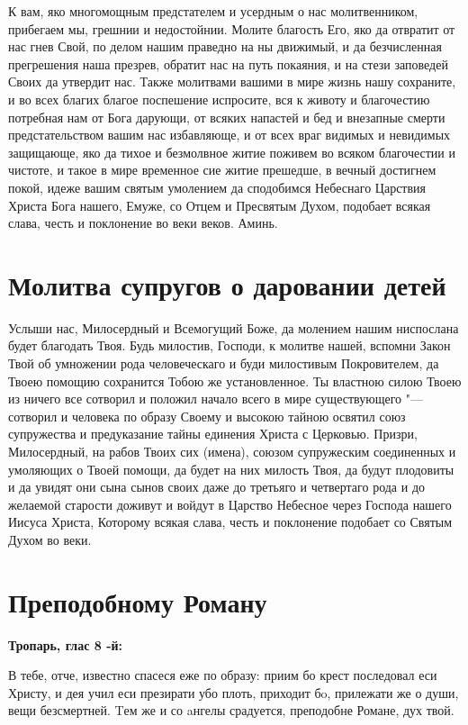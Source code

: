 К вам, яко многомощным предстателем и усердным о нас молитвенником, прибегаем мы, грешнии и недостойнии. Молите благость Его, яко да отвратит от нас гнев Свой, по делом нашим праведно на ны движимый, и да безчисленная прегрешения наша презрев, обратит нас на путь покаяния, и на стези заповедей Своих да утвердит нас. Также молитвами вашими в мире жизнь нашу сохраните, и во всех благих благое поспешение испросите, вся к животу и благочестию потребная нам от Бога дарующи, от всяких напастей и бед и внезапные смерти предстательством вашим нас избавляюще, и от всех враг видимых и невидимых защищающе, яко да тихое и безмолвное житие поживем во всяком благочестии и чистоте, и такое в мире временное сие житие прешедше, в вечный достигнем покой, идеже вашим святым умолением да сподобимся Небеснаго Царствия Христа Бога нашего, Емуже, со Отцем и Пресвятым Духом, подобает всякая слава, честь и поклонение во веки веков. Аминь.

\section{Молитва супругов о даровании детей}
 


Услыши нас, Милосердный и Всемогущий Боже, да молением нашим ниспослана будет благодать Твоя. Будь милостив, Господи, к молитве нашей, вспомни Закон Твой об умножении рода человеческаго и буди милостивым Покровителем, да Твоею помощию сохранится Тобою же установленное. Ты властною силою Твоею из ничего все сотворил и положил начало всего в мире существующего "--- сотворил и человека по образу Своему и высокою тайною освятил союз супружества и предуказание тайны единения Христа с Церковью. Призри, Милосердный, на рабов Твоих сих (имена), союзом супружеским соединенных и умоляющих о Твоей помощи, да будет на них милость Твоя, да будут плодовиты и да увидят они сына сынов своих даже до третьяго и четвертаго рода и до желаемой старости доживут и войдут в Царство Небесное через Господа нашего Иисуса Христа, Которому всякая слава, честь и поклонение подобает со Святым Духом во веки. 


\section{Преподобному Роману}
 
\bfseries Тропарь, глас 8 -й:\normalfont{}


В тебе, отче, известно спасеся еже по образу: приим бо крест последовал еси Христу,  и дея учил еси презирати убо плоть, приходит бo, прилежати же о души, вещи безсмертней. Tем же и со aнгелы срадуется, преподобне Романе, дух твой.


